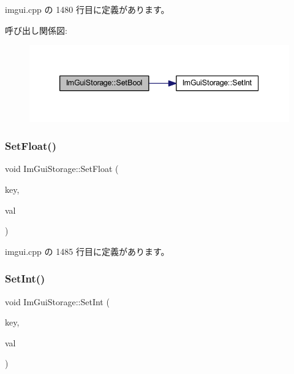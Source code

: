  imgui.\+cpp の 1480 行目に定義があります。

呼び出し関係図\+:\nopagebreak
\begin{figure}[H]
\begin{center}
\leavevmode
\includegraphics[width=339pt]{struct_im_gui_storage_ac5beee31a59b3f5294b41992717be7bf_cgraph}
\end{center}
\end{figure}
\mbox{\label{struct_im_gui_storage_ab531d90a0e5a1a2453e351c499149756}} 
\subsubsection{\texorpdfstring{Set\+Float()}{SetFloat()}}
{\footnotesize\ttfamily void Im\+Gui\+Storage\+::\+Set\+Float (\begin{DoxyParamCaption}\item[{\mbox{\hyperlink{imgui_8h_a1785c9b6f4e16406764a85f32582236f}{Im\+Gui\+ID}}}]{key,  }\item[{float}]{val }\end{DoxyParamCaption})}



 imgui.\+cpp の 1485 行目に定義があります。

\mbox{\label{struct_im_gui_storage_af83975ca841a9bd0e06a6ea0a41bf159}} 
\subsubsection{\texorpdfstring{Set\+Int()}{SetInt()}}
{\footnotesize\ttfamily void Im\+Gui\+Storage\+::\+Set\+Int (\begin{DoxyParamCaption}\item[{\mbox{\hyperlink{imgui_8h_a1785c9b6f4e16406764a85f32582236f}{Im\+Gui\+ID}}}]{key,  }\item[{int}]{val }\end{DoxyParamCaption})}



